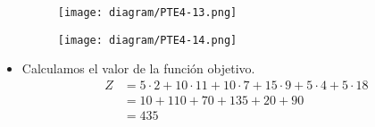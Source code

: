 \documentclass{templateNote}
\begin{document}
\begin{itemize}
    \begin{figure}[H]
        \centering
        \texttt{[image: diagram/PTE4-13.png]}
    \end{figure}

    \begin{figure}[H]
        \centering
        \texttt{[image: diagram/PTE4-14.png]}
    \end{figure}

    \item Calculamos el valor de la función objetivo.
    \begin{align*}
        Z &= 5 \cdot 2 + 10 \cdot 11 + 10 \cdot 7 + 15 \cdot 9 + 5 \cdot 4 + 5 \cdot 18\\
        &= 10 + 110 + 70 + 135 + 20 + 90 \\
        &= 435
    \end{align*}
\end{itemize}
\end{document}
